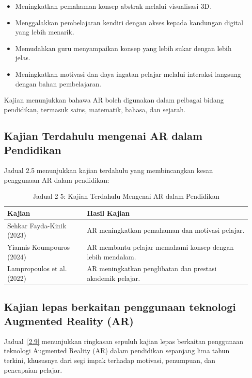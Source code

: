 \begin{itemize}
    \item Meningkatkan pemahaman konsep abstrak melalui visualisasi 3D.
    \item Menggalakkan pembelajaran kendiri dengan akses kepada kandungan digital yang lebih menarik.
    \item Memudahkan guru menyampaikan konsep yang lebih sukar dengan lebih jelas.
    \item Meningkatkan motivasi dan daya ingatan pelajar melalui interaksi langsung dengan bahan pembelajaran.
\end{itemize}

Kajian menunjukkan bahawa AR boleh digunakan dalam pelbagai bidang pendidikan, termasuk sains, matematik, bahasa, dan sejarah.

\subsection{{Kajian Terdahulu mengenai AR dalam Pendidikan}}

Jadual 2.5 menunjukkan kajian terdahulu yang membincangkan kesan penggunaan AR dalam pendidikan:

\begin{table}[ht]
    \centering
    \caption{Jadual 2-5: Kajian Terdahulu Mengenai AR dalam Pendidikan}
    \begin{tabular}{@{}>{\raggedright\arraybackslash}p{7cm}>{\raggedright\arraybackslash}p{7cm}@{}}
        \toprule
        \textbf{Kajian} & \textbf{Hasil Kajian} \\
        \midrule
        Sehkar Fayda-Kinik (2023) & AR meningkatkan pemahaman dan motivasi pelajar. \\
        Yiannis Koumpouros (2024) & AR membantu pelajar memahami konsep dengan lebih mendalam. \\
        Lampropoulos et al. (2022) & AR meningkatkan penglibatan dan prestasi akademik pelajar. \\
        \bottomrule
    \end{tabular}
\end{table}

\subsection{Kajian lepas berkaitan penggunaan teknologi Augmented Reality (AR)}

Jadual~\ref{2.9} menunjukkan ringkasan sepuluh kajian lepas berkaitan penggunaan teknologi Augmented Reality (AR) dalam pendidikan sepanjang lima tahun terkini, khususnya dari segi impak terhadap motivasi, penumpuan, dan pencapaian pelajar.


